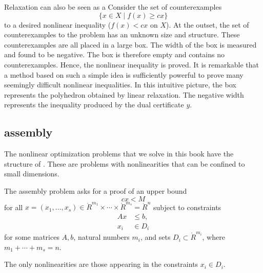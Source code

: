 \begin{remark}
Relaxation can also be seen as a   Consider the set of counterexamples
\[
\{x\in X\mid f(x)\ge c x\}
\]
to a desired nonlinear inequality ($f(x)< c x$ on $X$).  At the
outset, the set of counterexamples to the problem has an unknown size
and structure.  These counterexamples are all placed in a large box.
The width of the box is measured and found to be negative.  The box is
therefore empty and contains no counterexamples. Hence, the nonlinear
inequality is proved.  It is remarkable that a method based on such a
simple idea is sufficiently powerful to prove many seemingly difficult
nonlinear inequalities.  In this intuitive picture, the box represents
the polyhedron obtained by linear relaxation.  The negative width
represents the inequality produced by the dual certificate $y$.
\end{remark}

\subsection{assembly}\label{sec:assembly}

The nonlinear optimization problems that we solve in this book have
the structure of .  These are
problems with nonlinearities that can be confined to small dimensions.

\begin{definition}\label{def:lap}
The assembly problem asks for a proof of an upper bound
\[  %
c x < M
\]
for all $x=(x_1,\ldots,x_s)\in \ring{R}^{m_1}\times\cdots
\times\ring{R}^{m_s}=\ring{R}^n$
subject to constraints
\begin{align*}
A x &\le b,\\
x_i &\in D_i
\end{align*}
for some matrices $A,b$, natural numbers $m_i$, and sets $D_i\subset
\ring{R}^{m_i}$, where $m_1+\cdots+m_s = n$.  
\end{definition}

The only nonlinearities
are those appearing in the constraints $x_i\in D_i$.

